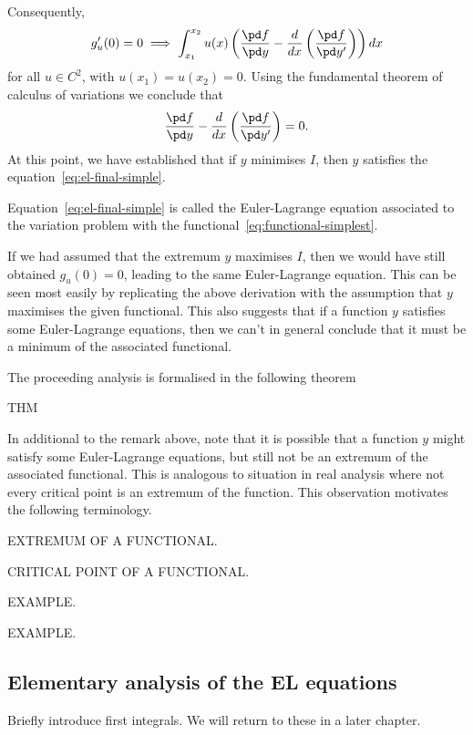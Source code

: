 Consequently,
\begin{equation}
    g'_{u}(0) = 0 \implies \int_{x_1}^{x_2} u(x) \left( \frac{\pd f}{\pd y} - \frac{d}{dx}\left(\frac{\pd f}{\pd y'}\right) \right) dx
\end{equation}
for all $u \in C^2$, with $u(x_1) = u(x_2) = 0$. Using the fundamental theorem of calculus of variations we conclude that
\begin{equation}
    \frac{\pd f}{\pd y} - \frac{d}{dx}\left(\frac{\pd f}{\pd y'}\right) = 0.
    \label{eq:el-final-simple}
\end{equation}
At this point, we have established that if $y$ minimises $I$, then $y$ satisfies the equation~\eqref{eq:el-final-simple}.

Equation~\eqref{eq:el-final-simple} is called the Euler-Lagrange equation associated to the variation problem with the functional~\eqref{eq:functional-simplest}.

\begin{remark}
    If we had assumed that the extremum $y$ maximises $I$, then we would have still obtained $g_{u}(0)=0$, leading to the same Euler-Lagrange equation. This can be seen most easily by replicating the above derivation with the assumption that $y$ maximises the given functional. This also suggests that if a function $y$ satisfies some Euler-Lagrange equations, then we can't in general conclude that it must be a minimum of the associated functional.
\end{remark}

The proceeding analysis is formalised in the following theorem
\begin{nthm}
    THM
\end{nthm}

In additional to the remark above, note that it is possible that a function $y$ might satisfy some Euler-Lagrange equations, but still not be an extremum of the associated functional. This is analogous to situation in real analysis where not every critical point is an extremum of the function. This observation motivates the following terminology.
\begin{ndfn}
    EXTREMUM OF A FUNCTIONAL.
\end{ndfn}
\begin{ndfn}
    CRITICAL POINT OF A FUNCTIONAL.
\end{ndfn}

EXAMPLE.

EXAMPLE.

\subsection{Elementary analysis of the EL equations}
Briefly introduce first integrals. We will return to these in a later chapter.

